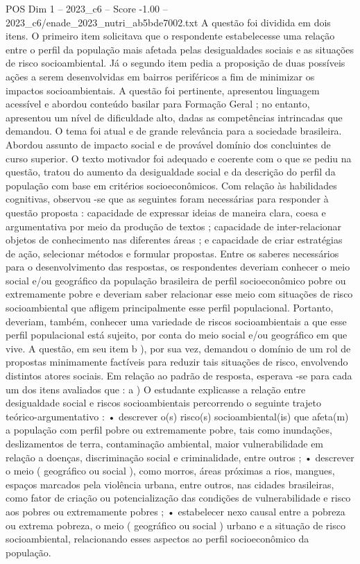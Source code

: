 \begin{textsample}{POS Dim 1 – 2023\_c6 – Score -1.00 – 2023\_c6/enade\_2023\_nutri\_ab5bde7002.txt}
A questão foi dividida em dois itens.
O primeiro item solicitava que o respondente estabelecesse uma relação entre o perfil da população mais afetada pelas desigualdades sociais e as situações de risco socioambiental.
Já o segundo item pedia a proposição de duas possíveis ações a serem desenvolvidas em bairros periféricos a fim de minimizar os impactos socioambientais.
A questão foi pertinente, apresentou linguagem acessível e abordou conteúdo basilar para Formação Geral ; no entanto, apresentou um nível de dificuldade alto, dadas as competências intrincadas que demandou.
O tema foi atual e de grande relevância para a sociedade brasileira.
Abordou assunto de impacto social e de provável domínio dos concluintes de curso superior.
O texto motivador foi adequado e coerente com o que se pediu na questão, tratou do aumento da desigualdade social e da descrição do perfil da população com base em critérios socioeconômicos.
Com relação às habilidades cognitivas, observou -se que as seguintes foram necessárias para responder à questão proposta : capacidade de expressar ideias de maneira clara, coesa e argumentativa por meio da produção de textos ; capacidade de inter-relacionar objetos de conhecimento nas diferentes áreas ; e capacidade de criar estratégias de ação, selecionar métodos e formular propostas.
Entre os saberes necessários para o desenvolvimento das respostas, os respondentes deveriam conhecer o meio social e/ou geográfico da população brasileira de perfil socioeconômico pobre ou extremamente pobre e deveriam saber relacionar esse meio com situações de risco socioambiental que afligem principalmente esse perfil populacional.
Portanto, deveriam, também, conhecer uma variedade de riscos socioambientais a que esse perfil populacional está sujeito, por conta do meio social e/ou geográfico em que vive.
A questão, em seu item b ), por sua vez, demandou o domínio de um rol de propostas minimamente factíveis para reduzir tais situações de risco, envolvendo distintos atores sociais.
Em relação ao padrão de resposta, esperava -se para cada um dos itens avaliados que : a ) O estudante explicasse a relação entre desigualdade social e riscos socioambientais percorrendo o seguinte trajeto teórico-argumentativo : • descrever o(s) risco(s) socioambiental(is) que afeta(m) a população com perfil pobre ou extremamente pobre, tais como inundações, deslizamentos de terra, contaminação ambiental, maior vulnerabilidade em relação a doenças, discriminação social e criminalidade, entre outros ; • descrever o meio ( geográfico ou social ), como morros, áreas próximas a rios, mangues, espaços marcados pela violência urbana, entre outros, nas cidades brasileiras, como fator de criação ou potencialização das condições de vulnerabilidade e risco aos pobres ou extremamente pobres ; • estabelecer nexo causal entre a pobreza ou extrema pobreza, o meio ( geográfico ou social ) urbano e a situação de risco socioambiental, relacionando esses aspectos ao perfil socioeconômico da população.

\end{textsample}
